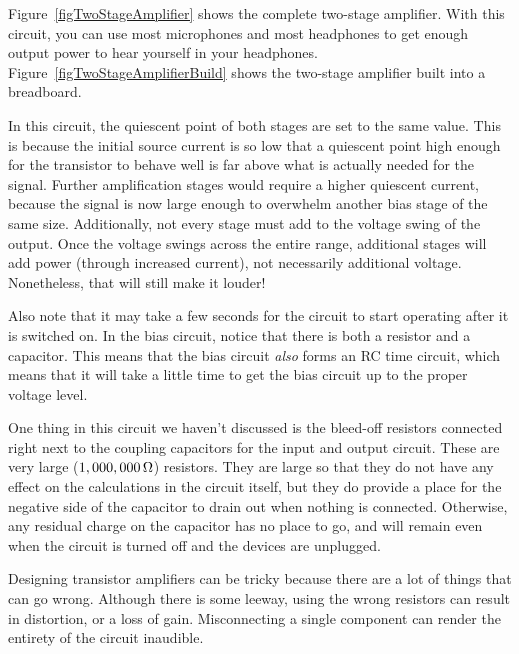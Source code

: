 Figure~\ref{figTwoStageAmplifier} shows the complete two-stage amplifier.
With this circuit, you can use most microphones and most headphones to get enough output power to hear yourself in your headphones.
Figure~\ref{figTwoStageAmplifierBuild} shows the two-stage amplifier built into a breadboard.



In this circuit, the quiescent point of both stages are set to the same value.
This is because the initial source current is so low that a quiescent point high enough for the transistor to behave well is far above what is actually needed for the signal.
Further amplification stages would require a higher quiescent current, because the signal is now large enough to overwhelm another bias stage of the same size.
Additionally, not every stage must add to the voltage swing of the output.
Once the voltage swings across the entire range, additional stages will add power (through increased current), not necessarily additional voltage.
Nonetheless, that will still make it louder!

Also note that it may take a few seconds for the circuit to start operating after it is switched on.
In the bias circuit, notice that there is both a resistor and a capacitor.
This means that the bias circuit \emph{also} forms an RC time circuit, which means that it will take a little time to get the bias circuit up to the proper voltage level.

One thing in this circuit we haven't discussed is the bleed-off resistors connected right next to the coupling capacitors for the input and output circuit.
These are very large ($1,000,000\,\si{\ohm}$) resistors.
They are large so that they do not have any effect on the calculations in the circuit itself, but they do provide a place for the negative side of the capacitor to drain out when nothing is connected.
Otherwise, any residual charge on the capacitor has no place to go, and will remain even when the circuit is turned off and the devices are unplugged.

Designing transistor amplifiers can be tricky because there are a lot of things that can go wrong.
Although there is some leeway, using the wrong resistors can result in distortion, or a loss of gain.
Misconnecting a single component can render the entirety of the circuit inaudible.


